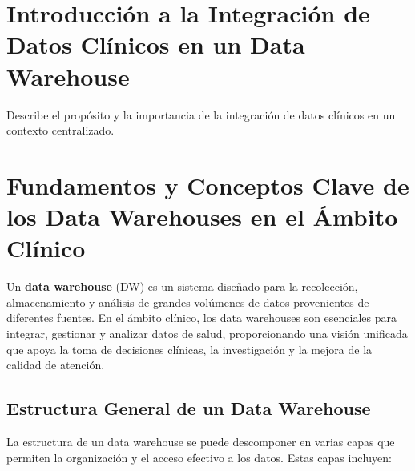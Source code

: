 \documentclass[12pt, a4paper, twoside]{article}
\begin{document}
	
	
	
	\clearpage
	\setcounter{page}{1}
	
	
	
	\tableofcontents
	\newpage
	
	\section{Introducción a la Integración de Datos Clínicos en un Data Warehouse}
	Describe el propósito y la importancia de la integración de datos clínicos en un contexto centralizado.
	
	\section{Fundamentos y Conceptos Clave de los Data Warehouses en el Ámbito Clínico}
	
	Un \textbf{data warehouse} (DW) es un sistema diseñado para la recolección, almacenamiento y análisis de grandes volúmenes de datos provenientes de diferentes fuentes. En el ámbito clínico, los data warehouses son esenciales para integrar, gestionar y analizar datos de salud, proporcionando una visión unificada que apoya la toma de decisiones clínicas, la investigación y la mejora de la calidad de atención.
	
	\subsection{Estructura General de un Data Warehouse}
	
	La estructura de un data warehouse se puede descomponer en varias capas que permiten la organización y el acceso efectivo a los datos. Estas capas incluyen:
	
\end{document}
